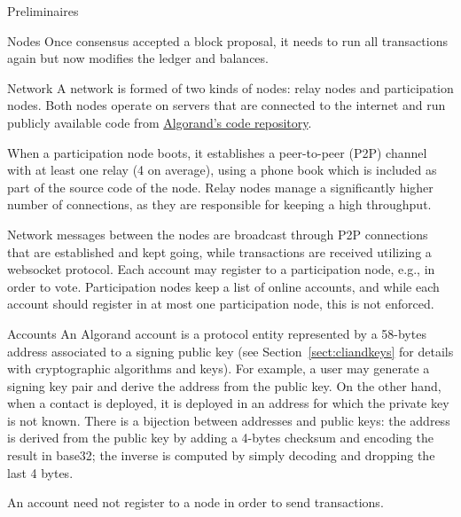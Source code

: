 \documentclass[10pt,a4paper]{article}
\begin{document}
\begin{section}{Preliminaires}
\begin{subsection}{Nodes}
Once consensus accepted a block proposal, it needs to run all transactions again
but now modifies the ledger and balances. 
\end{subsection}    
\begin{subsection}{Network}\label{sect:network}
A network is formed of two kinds of nodes: {\sf relay nodes}
and {\sf participation nodes}. 
Both nodes operate on servers that are connected to the internet and run publicly
available code from \href{https://github.com/algorand/go-algorand}{Algorand's code repository}.

When a participation node boots, it establishes a peer-to-peer (P2P) 
channel with at least one relay (4 on average), using a phone book which is included
as part of the source code of the node. 
Relay nodes manage a significantly higher number of connections, as they 
are responsible for keeping a high throughput.

Network messages between the nodes are broadcast through P2P connections that are
established and kept going, while transactions are received utilizing a websocket 
protocol.
Each account may register to a participation node, e.g., in order to vote.
Participation nodes keep a list of online accounts, and while each account should
register in at most one participation node, this is not enforced.

\end{subsection}
\begin{subsection}{Accounts}\label{sect:accounts}
An Algorand account is a protocol entity represented by a 58-bytes address
associated to a signing public key (see Section~\ref{sect:cliandkeys} for
details with cryptographic algorithms and keys).
For example, a user may generate a signing key pair and derive the address
from the public key. On the other hand, when a contact is deployed, it is
deployed in an address for which the private key is not known.
There is a bijection between addresses and public keys: the address is 
derived from the public key by adding a 4-bytes checksum and encoding the result
in base32; the inverse is computed by simply decoding and dropping the last 4 
bytes.

An account need not register to a node in order to send transactions.


\end{subsection}
\end{section}
\end{document}
